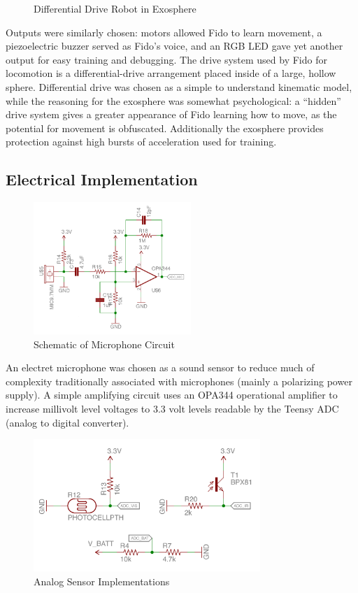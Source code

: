 \begin{figure}
	\centering
	
	\caption{Differential Drive Robot in Exosphere}
\end{figure}

Outputs were similarly chosen: motors allowed Fido to learn movement, a piezoelectric buzzer served as Fido's voice, and an RGB LED gave yet another output for easy training and debugging.  The drive system used by Fido for locomotion is a differential-drive arrangement placed inside of a large, hollow sphere.  Differential drive was chosen as a simple to understand kinematic model, while the reasoning for the exosphere was somewhat psychological: a ``hidden'' drive system gives a greater appearance of Fido learning how to move, as the potential for movement is obfuscated.  Additionally the exosphere provides protection against high bursts of acceleration used for training.

\subsection{Electrical Implementation}

\begin{figure}[ht]
	\centering
	\includegraphics[height=5cm]{Figures/micDiagram.png}
	\caption{Schematic of Microphone Circuit}
\end{figure}

An electret microphone was chosen as a sound sensor to reduce much of complexity traditionally associated with microphones (mainly a polarizing power supply).  A simple amplifying circuit uses an OPA344 operational amplifier to increase millivolt level voltages to 3.3 volt levels readable by the Teensy ADC (analog to digital converter).

\begin{figure}[ht]
	\centering
	\includegraphics[height=5cm]{Figures/divDiagram.png}
	\caption{Analog Sensor Implementations}
\end{figure}

